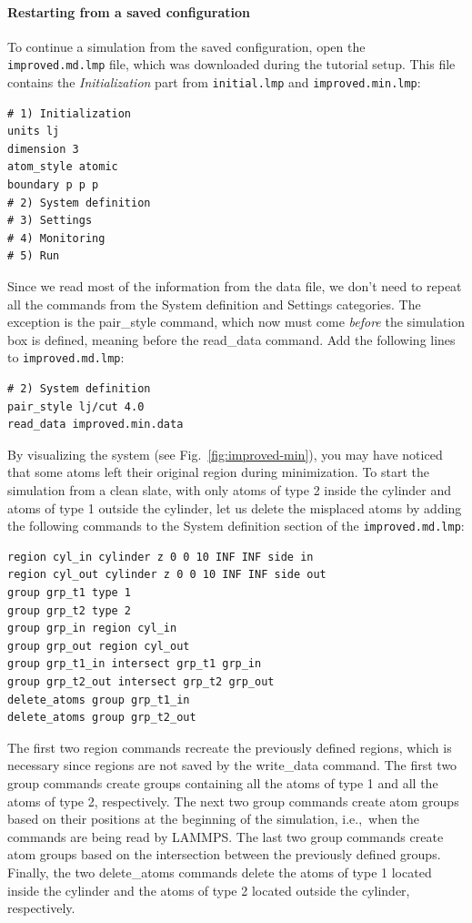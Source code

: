 \documentclass[9pt,tutorial]{livecoms}
\newcommand{\lmpcmd}[1]{\colorbox{listing}{\textcolor{command}{\small{#1}}}} %
\newcommand{\flecmd}[1]{\textcolor{command}{\texttt{#1}}} %
\begin{document}
\paragraph{Restarting from a saved configuration}

To continue a simulation from the saved configuration, open the
\flecmd{improved.md.lmp} file, which was downloaded during the tutorial setup.
This file contains the \textit{Initialization} part from \flecmd{initial.lmp}
and \flecmd{improved.min.lmp}:
\begin{lstlisting}
# 1) Initialization
units lj
dimension 3
atom_style atomic
boundary p p p
# 2) System definition
# 3) Settings
# 4) Monitoring
# 5) Run
\end{lstlisting}
Since we read most of the information from the data file, we don't need
to repeat all the commands from the \lmpcmd{System definition}
and \lmpcmd{Settings} categories.  The exception is the \lmpcmd{pair\_style}
command, which now must come \emph{before} the simulation box is defined,
meaning before the \lmpcmd{read\_data} command.  Add the following
lines to \flecmd{improved.md.lmp}:
\begin{lstlisting}
# 2) System definition
pair_style lj/cut 4.0
read_data improved.min.data
\end{lstlisting}

By visualizing the system (see Fig.~\ref{fig:improved-min}), you may
have noticed that some atoms left their original region during
minimization.  To start the simulation from a clean slate, with only
atoms of type 2 inside the cylinder and atoms of type 1 outside the
cylinder, let us delete the misplaced atoms by adding the following
commands to the \lmpcmd{System definition} section of 
the \flecmd{improved.md.lmp}:

\begin{lstlisting}
region cyl_in cylinder z 0 0 10 INF INF side in
region cyl_out cylinder z 0 0 10 INF INF side out
group grp_t1 type 1
group grp_t2 type 2
group grp_in region cyl_in
group grp_out region cyl_out
group grp_t1_in intersect grp_t1 grp_in
group grp_t2_out intersect grp_t2 grp_out
delete_atoms group grp_t1_in
delete_atoms group grp_t2_out
\end{lstlisting}
The first two \lmpcmd{region} commands recreate the previously defined
regions, which is necessary since regions are not saved by the
\lmpcmd{write\_data} command.  The first two \lmpcmd{group} commands
create groups containing all the atoms of type 1 and all the
atoms of type 2, respectively.  The next two \lmpcmd{group} commands
create atom groups based on their positions at the beginning of the
simulation, i.e.,~when the commands are being read by LAMMPS.  The last
two \lmpcmd{group} commands create atom groups based on the intersection
between the previously defined groups.  Finally, the two
\lmpcmd{delete\_atoms} commands delete the atoms of type 1
located inside the cylinder and the atoms of type 2 located
outside the cylinder, respectively.
\end{document}
